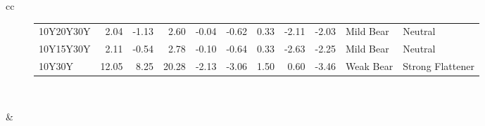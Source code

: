 \documentclass[a4paper,oneside]{report}
\begin{document}
\begin{figure}[htbp]
\begin{tabular}[c]{cc}
\begin{subfigure}[c]{0.5\textwidth}
\begin{adjustbox}{max width=\textwidth}
\begin{tabular}{lrrrrrrrrll}
 10Y20Y30Y &    2.04 &    -1.13 &      2.60 &  -0.04 & -0.62 &      0.33 &  -2.11 &    -2.03 &    Mild Bear &           Neutral \\
 10Y15Y30Y &    2.11 &    -0.54 &      2.78 &  -0.10 & -0.64 &      0.33 &  -2.63 &    -2.25 &    Mild Bear &           Neutral \\
    10Y30Y &   12.05 &     8.25 &     20.28 &  -2.13 & -3.06 &      1.50 &   0.60 &    -3.46 &    Weak Bear &  Strong Flattener \\
\hline
\end{tabular}
\end{adjustbox}
\end{subfigure}\\
 
 

\begin{subfigure}[c]{0.5\textwidth}
\label{fig:Switch EUR}
 
 \null\hfill
 \end{subfigure}&
 

\end{tabular}
\end{figure}
\end{document}
